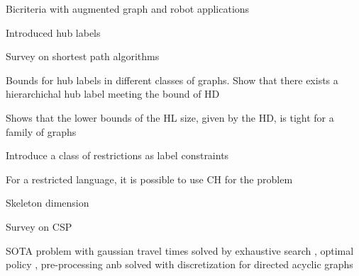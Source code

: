 Bicriteria with augmented graph and robot applications \cite{alex_bicriteria}

Introduced hub labels\cite{cohen_definition_hl}

Survey on shortest path algorithms \cite{goldberg_survey}

Bounds for hub labels in different classes of graphs. 
Show that there exists a hierarchichal hub label meeting the bound of HD \cite{babenko_hl_complexity}

Shows that the lower bounds of the HL size, given by the HD, is tight for a family of graphs \cite{white_complexity_hd}

Introduce a class of restrictions as label constraints \cite{language_csp}

For a restricted language, it is possible to use CH for the problem \cite{rice_csp}

Skeleton dimension \cite{skeleton}

Survey on CSP \cite{csp_survey}

SOTA problem with gaussian travel times solved by exhaustive search \cite{nikolova_gaussian}, optimal policy \cite{samaranayake2012speedup}, pre-processing \cite{sabran2014precomputation} anb solved with discretization for directed acyclic graphs \cite{nikolova_discretization}